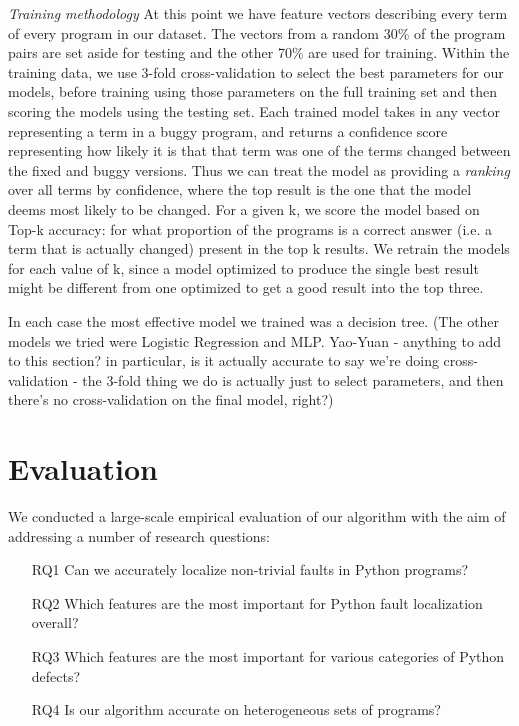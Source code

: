\documentclass[conference]{IEEEtran}
\begin{document}
\emph{Training methodology} At this point we have feature vectors describing every term of every program in
our dataset. The vectors from a random 30\% of the program pairs are set aside for testing and
the other 70\% are used for training. Within the training data, we use 3-fold
cross-validation to select the best parameters for our models, before training
using those parameters on the full training set and then scoring the models
using the testing set. Each trained model takes in any vector representing a term
in a buggy program, and returns a confidence score representing how likely it is that
that term was one of the terms changed between the fixed and buggy versions.
Thus we can treat the model as providing a \emph{ranking} over all terms by
confidence, where the top result is the one that the model deems most likely
to be changed. For
a given k, we score the model based on Top-k accuracy: for what proportion of the
programs is a correct answer (i.e. a term that is actually changed) present in the
top k results. We retrain the models for each value of k, since a model optimized
to produce the single best result might be different from one optimized to get a
good result into the top three.

In each case the most effective model we trained was a decision tree. (The other
models we tried were Logistic Regression and MLP. Yao-Yuan - anything to add to
this section? in particular, is it actually accurate to say we're doing
cross-validation - the 3-fold thing we do is actually just to select parameters,
and then there's no cross-validation on the final model, right?)

\section{Evaluation}
\label{sec-eval}

We conducted a large-scale empirical evaluation of our algorithm with the
aim of addressing a number of research questions:
\begin{enumerate}

\item[RQ1]{Can we accurately localize non-trivial faults in Python
programs?}

\item[RQ2]{Which features are the most important for Python fault
localization overall?}

\item[RQ3]{Which features are the most important for various categories of
Python defects?}

\item[RQ4]{Is our algorithm accurate on heterogeneous sets of programs?}

\end{enumerate}
\end{document}
